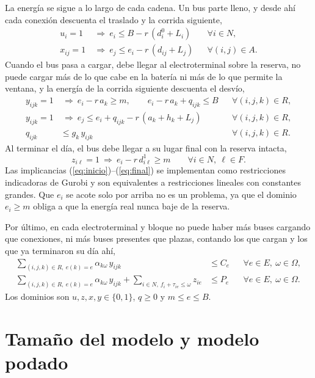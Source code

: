La energía se sigue a lo largo de cada cadena. Un bus parte lleno, y desde ahí cada conexión descuenta el traslado y la corrida siguiente,
\begin{align}
u_i=1 &\ \Rightarrow\ e_i\le B-r\,(d^{0}_i+L_i) && \forall i\in N, \label{eq:inicio}\\
x_{ij}=1 &\ \Rightarrow\ e_j\le e_i-r\,(d_{ij}+L_j) && \forall (i,j)\in A. \label{eq:directo}
\end{align}
Cuando el bus pasa a cargar, debe llegar al electroterminal sobre la reserva, no puede cargar más de lo que cabe en la batería ni más de lo que permite la ventana, y la energía de la corrida siguiente descuenta el desvío,
\begin{align}
y_{ijk}=1 &\ \Rightarrow\ e_i-r\,a_k\ge m,\qquad e_i-r\,a_k+q_{ijk}\le B && \forall (i,j,k)\in R, \label{eq:carga-llegada}\\
y_{ijk}=1 &\ \Rightarrow\ e_j\le e_i+q_{ijk}-r\,(a_k+h_k+L_j) && \forall (i,j,k)\in R, \label{eq:carga-balance}\\
q_{ijk} &\le g_k\,y_{ijk} && \forall (i,j,k)\in R. \label{eq:carga-max}
\end{align}
Al terminar el día, el bus debe llegar a su lugar final con la reserva intacta,
\begin{equation}
z_{i\ell}=1\ \Rightarrow\ e_i-r\,d^{1}_{i\ell}\ge m\qquad \forall i\in N,\ \ell\in F. \label{eq:final}
\end{equation}
Las implicancias (\ref{eq:inicio})--(\ref{eq:final}) se implementan como restricciones indicadoras de Gurobi y son equivalentes a restricciones lineales con constantes grandes. Que \(e_i\) se acote solo por arriba no es un problema, ya que el dominio \(e_i\ge m\) obliga a que la energía real nunca baje de la reserva.

Por último, en cada electroterminal y bloque no puede haber más buses cargando que conexiones, ni más buses presentes que plazas, contando los que cargan y los que ya terminaron su día ahí,
\begin{align}
\sum_{(i,j,k)\in R,\ e(k)=e}\alpha_{k\omega}\,y_{ijk} &\le C_e && \forall e\in E,\ \omega\in\Omega, \label{eq:conexiones}\\
\sum_{(i,j,k)\in R,\ e(k)=e}\alpha_{k\omega}\,y_{ijk}+\sum_{i\in N,\ f_i+\tau_{ie}\le \omega}z_{ie} &\le P_e && \forall e\in E,\ \omega\in\Omega. \label{eq:plazas}
\end{align}
Los dominios son \(u,z,x,y\in\{0,1\}\), \(q\ge 0\) y \(m\le e\le B\).

\section{Tamaño del modelo y modelo podado}
\label{sec:tamano}


